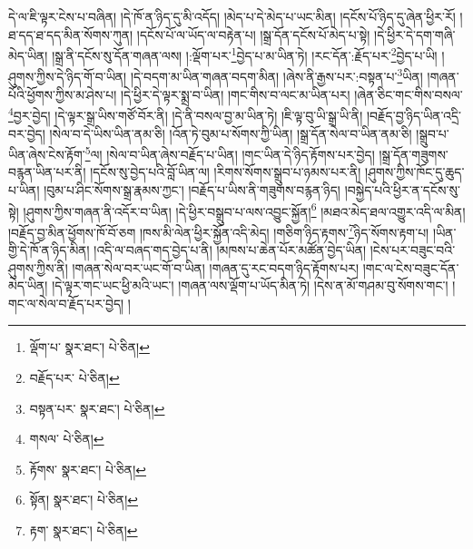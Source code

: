 དེ་ལ་ཇི་ལྟར་ངེས་པ་བཞིན། །དེ་ཁོ་ན་ཉིད་དུ་མི་འདོད། །མེད་པ་དེ་མེད་པ་ཡང་མིན། །དངོས་པོ་ཉིད་དུ་ཞེན་ཕྱིར་རོ། །ཐ་དད་ཐ་དད་མིན་སོགས་ཀུན། །དངོས་པོ་ལ་ཡོད་ལ་བརྟེན་པ། །སྒྲ་དོན་དངོས་པོ་མེད་པ་སྟེ། །དེ་ཕྱིར་དེ་དག་གཞི་མེད་ཡིན། །སྒྲ་ནི་དངོས་སུ་དོན་གཞན་ལས། །:ལྡོག་པར་\footnote{ལྡོག་པ་  སྣར་ཐང་།  པེ་ཅིན། }བྱེད་པ་མ་ཡིན་ཏེ། །རང་དོན་:རྗོད་པར་\footnote{བརྗོད་པར་  པེ་ཅིན། }བྱེད་པ་ཡི། །ཤུགས་ཀྱིས་དེ་ཉིད་གོ་བ་ཡིན། །དེ་བདག་མ་ཡིན་གཞན་བདག་མིན། །ཞེས་ནི་རྒྱས་པར་:བསྟན་པ་\footnote{བསྟན་པར་  སྣར་ཐང་།  པེ་ཅིན། }ཡིན། །གཞན་པོའི་ཕྱོགས་ཀྱིས་མ་ཤེས་པ། །དེ་ཕྱིར་དེ་ལྟར་སྨྲ་བ་ཡིན། །གང་གིས་བ་ལང་མ་ཡིན་པར། །ཞེན་ཅིང་གང་གིས་བསལ་\footnote{གསལ་  པེ་ཅིན། }བྱར་བྱེད། །དེ་ལྟར་སྒྲ་ཡིས་གཙོ་བོར་ནི། །དེ་ནི་བསལ་བྱ་མ་ཡིན་ཏེ། །ཇི་ལྟ་བུ་ཡི་སྒྲ་ཡི་ནི། །བརྗོད་བྱ་ཉིད་ཡིན་འདྲི་བར་བྱེད། །སེལ་བ་དེ་ཡིས་ཡིན་ནམ་ཅི། །འོན་ཏེ་བུམ་པ་སོགས་ཀྱི་ཡིན། །སྒྲ་དོན་སེལ་བ་ཡིན་ནམ་ཅི། །སྒྲུབ་པ་ཡིན་ཞེས་ངེས་རྟོག་\footnote{རྟོགས་  སྣར་ཐང་།  པེ་ཅིན། }ལ། །སེལ་བ་ཡིན་ཞེས་བརྗོད་པ་ཡིན། །གང་ཡིན་དེ་ཉིད་རྟོགས་པར་བྱེད། །སྒྲ་དོན་གཟུགས་བརྙན་ཡིན་པར་ནི། །དངོས་སུ་བྱེད་པའི་བློ་ཡིན་ལ། །རིགས་སོགས་སྒྲུབ་པ་ཉམས་པར་ནི། །ཤུགས་ཀྱིས་ཁོང་དུ་ཆུད་པ་ཡིན། །བུམ་པ་ཤིང་སོགས་སྒྲ་རྣམས་ཀྱང་། །བརྗོད་པ་ཡིས་ནི་གཟུགས་བརྙན་ཉིད། །བསྐྱེད་པའི་ཕྱིར་ན་དངོས་སུ་སྟེ། །ཤུགས་ཀྱིས་གཞན་ནི་འདོར་བ་ཡིན། །དེ་ཕྱིར་བསྒྲུབ་པ་ལས་འབྱུང་སྐྱོན།\footnote{སྟོན།  སྣར་ཐང་།  པེ་ཅིན། } །མཐའ་མེད་ཐལ་འགྱུར་འདི་ལ་མིན། །བརྗོད་བྱ་མིན་ཕྱོགས་ཁོ་བོ་ཅག །ཁས་མི་ལེན་ཕྱིར་སྐྱོན་འདི་མེད། །གཅིག་ཉིད་རྟགས་\footnote{རྟག་  སྣར་ཐང་།  པེ་ཅིན། }ཉིད་སོགས་རྟག་པ། །ཡིན་གྱི་དེ་ཁོ་ན་ཉིད་མིན། །འདི་ལ་བཞད་གད་བྱེད་པ་ནི། །མཁས་པ་ཆེན་པོར་མཚོན་བྱེད་ཡིན། །ངེས་པར་བཟུང་བའི་ཤུགས་ཀྱིས་ནི། །གཞན་སེལ་བར་ཡང་གོ་བ་ཡིན། །གཞན་དུ་རང་བདག་ཉིད་རྟོགས་པར། །གང་ལ་ངེས་བཟུང་དོན་མེད་ཡིན། །དེ་ལྟར་གང་ཡང་ཕྱི་མའི་ཡང་། །གཞན་ལས་ལྡོག་པ་ཡོད་མིན་ཏེ། །དེས་ན་མོ་གཤམ་བུ་སོགས་གང་། །གང་ལ་སེལ་བ་རྗོད་པར་བྱེད། །
